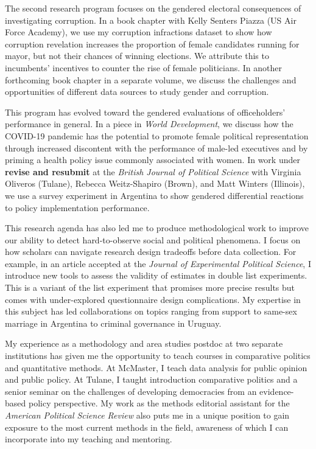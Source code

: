 \documentclass[
  12pt,
]{letter}
\begin{document}
\begin{letter}{}
The second research program focuses on the gendered electoral
consequences of investigating corruption. In a book chapter with Kelly
Senters Piazza (US Air Force Academy), we use my corruption infractions
dataset to show how corruption revelation increases the proportion of
female candidates running for mayor, but not their chances of winning
elections. We attribute this to incumbents' incentives to counter the
rise of female politicians. In another forthcoming book chapter in a
separate volume, we discuss the challenges and opportunities of
different data sources to study gender and corruption.

This program has evolved toward the gendered evaluations of
officeholders' performance in general. In a piece in \emph{World
Development}, we discuss how the COVID-19 pandemic has the potential to
promote female political representation through increased discontent
with the performance of male-led executives and by priming a health
policy issue commonly associated with women. In work under
\textbf{revise and resubmit} at the \emph{British Journal of Political
Science} with Virginia Oliveros (Tulane), Rebecca Weitz-Shapiro (Brown),
and Matt Winters (Illinois), we use a survey experiment in Argentina to
show gendered differential reactions to policy implementation
performance.

This research agenda has also led me to produce methodological work to
improve our ability to detect hard-to-observe social and political
phenomena. I focus on how scholars can navigate research design
tradeoffs before data collection. For example, in an article accepted at
the \emph{Journal of Experimental Political Science}, I introduce new
tools to assess the validity of estimates in double list experiments.
This is a variant of the list experiment that promises more precise
results but comes with under-explored questionnaire design
complications. My expertise in this subject has led collaborations on
topics ranging from support to same-sex marriage in Argentina to
criminal governance in Uruguay.

My experience as a methodology and area studies postdoc at two separate
institutions has given me the opportunity to teach courses in
comparative politics and quantitative methods. At McMaster, I teach data
analysis for public opinion and public policy. At Tulane, I taught
introduction comparative politics and a senior seminar on the challenges
of developing democracies from an evidence-based policy perspective. My
work as the methods editorial assistant for the \emph{American Political
Science Review} also puts me in a unique position to gain exposure to
the most current methods in the field, awareness of which I can
incorporate into my teaching and mentoring.


\end{letter}
\end{document}
